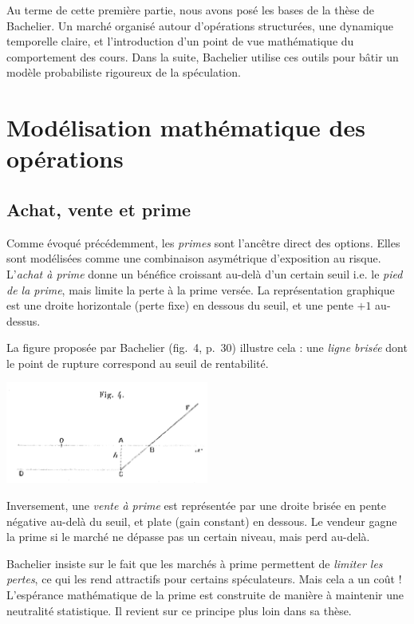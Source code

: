 \documentclass[12pt,a4paper]{article}
\begin{document}
\bigskip

\noindent
Au terme de cette première partie, nous avons  posé les bases de la thèse de Bachelier. Un marché organisé autour d’opérations structurées, une dynamique temporelle claire, et l’introduction d'un point de vue mathématique du comportement des cours. Dans la suite, Bachelier utilise ces outils pour bâtir un modèle probabiliste rigoureux de la spéculation.

\section{Modélisation mathématique des opérations}

\subsection{Achat, vente et prime}

Comme évoqué précédemment, les \textit{primes} sont l’ancêtre direct des options. Elles sont modélisées comme une combinaison asymétrique d’exposition au risque. L’\textit{achat à prime} donne un bénéfice croissant au-delà d’un certain seuil i.e. le \textit{pied de la prime}, mais limite la perte à la prime versée. La représentation graphique est une droite horizontale (perte fixe) en dessous du seuil, et une pente $+1$ au-dessus.

La figure proposée par Bachelier (fig.~4, p.~30) illustre cela : une \textit{ligne brisée} dont le point de rupture correspond au seuil de rentabilité.

\begin{center}
    \includegraphics[width=0.5\textwidth]{fig4.png}
\end{center}

Inversement, une \textit{vente à prime} est représentée par une droite brisée en pente négative au-delà du seuil, et plate (gain constant) en dessous. Le vendeur gagne la prime si le marché ne dépasse pas un certain niveau, mais perd au-delà.

Bachelier insiste sur le fait que les marchés à prime permettent de \textit{limiter les pertes}, ce qui les rend attractifs pour certains spéculateurs. Mais cela a un coût ! L'espérance mathématique de la prime est construite de manière à maintenir une neutralité statistique. Il revient sur ce principe plus loin dans sa thèse.
\end{document}
